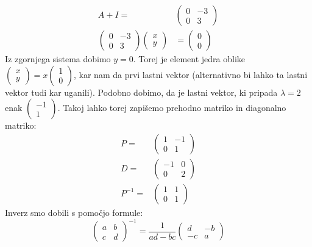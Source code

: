 \documentclass{article}
\begin{document}
\begin{align*}
A+I  =&
\begin{pmatrix}
0 & -3 \\
0  & 3
\end{pmatrix} \\
\begin{pmatrix}
0 & -3 \\
0  & 3
\end{pmatrix} 
\begin{pmatrix}
x \\ y \end{pmatrix} &= \begin{pmatrix} 0 \\ 0 \end{pmatrix}
\end{align*}
Iz zgornjega sistema dobimo $y=0$. Torej je element jedra oblike $\begin{pmatrix} x \\ y \end{pmatrix} = x \begin{pmatrix} 1 \\ 0 \end{pmatrix}$, kar nam da prvi lastni vektor (alternativno bi lahko ta lastni vektor tudi kar uganili).
Podobno dobimo, da je lastni vektor, ki pripada $\lambda = 2$ enak $\begin{pmatrix} -1 \\ 1 \end{pmatrix}$.
Takoj lahko torej zapišemo prehodno matriko in diagonalno matriko:
\begin{align*}
P  =&
\begin{pmatrix}
1 & -1 \\
0  & 1
\end{pmatrix} \\
D =& 
\begin{pmatrix}
-1 & 0 \\
0  & 2
\end{pmatrix} \\
P^{-1} =& 
\begin{pmatrix}
1 & 1 \\
0  & 1
\end{pmatrix}
\end{align*}
Inverz smo dobili s pomočjo formule:
\begin{equation*}
\begin{pmatrix}
a & b \\
c  & d
\end{pmatrix} ^{-1}
 = \frac{1}{ad-bc}
\begin{pmatrix}
d & -b \\
-c  & a
\end{pmatrix} 
\end{equation*}
\end{document}
